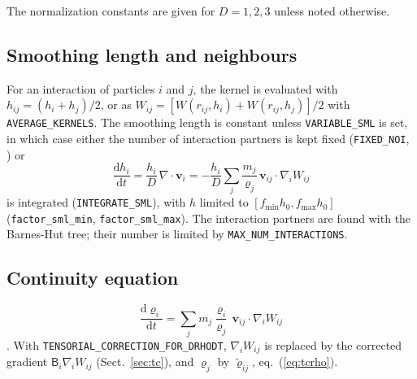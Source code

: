 \documentclass[10pt,fleqn,twoside]{article}
\renewcommand{\vec}[1]{{\mathbf #1}}
\newcommand{\code}[1]{\texttt{#1}}
\newcommand{\sw}[1]{\texttt{#1}}
\newcommand{\dd}{\mathrm{d}}
\newcommand{\gradW}{\nabla_{\!i} W_{ij}}
\begin{document}
The normalization constants are given for $D = 1, 2, 3$ unless noted otherwise.

\subsection{Smoothing length and neighbours}
For an interaction of particles $i$ and $j$, the kernel is evaluated with $h_{ij} = (h_i+h_j)/2$, or as
$W_{ij} = [W(r_{ij}, h_i) + W(r_{ij}, h_j)]/2$ with \sw{AVERAGE\_KERNELS}. The smoothing length is constant unless
\sw{VARIABLE\_SML} is set, in which case either the number of interaction partners is kept fixed
(\sw{FIXED\_NOI}, \citealt{hernquist:1989}) or
\begin{equation}
 \frac{\dd h_i}{\dd t} = \frac{h_i}{D}\,\nabla\cdot\vec v_i
   = -\frac{h_i}{D}\sum_j \frac{m_j}{\varrho_j}\,\vec v_{ij}\cdot\gradW
\end{equation}
is integrated (\sw{INTEGRATE\_SML}), with $h$ limited to
$[f_\mathrm{min} h_0, f_\mathrm{max} h_0]$ (\code{factor\_sml\_min}, \code{factor\_sml\_max}). The interaction
partners are found with the Barnes-Hut tree; their number is limited by \sw{MAX\_NUM\_INTERACTIONS}.

\subsection{Continuity equation}
\begin{equation}
 \frac{\dd\varrho_i}{\dd t} = \sum_j m_j\frac{\varrho_i}{\varrho_j}\,\vec v_{ij}\cdot\gradW
\end{equation}
\citep{randles:1996}. With \sw{TENSORIAL\_CORRECTION\_FOR\_DRHODT}, $\gradW$ is replaced by the corrected gradient
$\mathsf{B}_i\gradW$ (Sect.~\ref{sec:tc}), and $\varrho_j$ by $\tilde\varrho_{ij}$, eq.~(\ref{eq:tcrho}).
\end{document}
